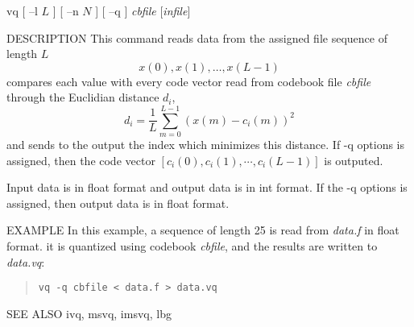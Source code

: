 
\begin{synopsis}
\item [vq] [ --l $L$ ] [ --n $N$ ] [ --q ] {\em cbfile} [{\em infile}]
\end{synopsis}

\begin{qsection}{DESCRIPTION}
This command reads data from the assigned file sequence of length $L$
\begin{displaymath}
  x(0),x(1),\ldots,x(L-1)
\end{displaymath}
compares each value with every code vector read from
codebook file {\em cbfile} through the Euclidian distance $d_i$,
\begin{displaymath}
d_i = \frac{1}{L}\sum_{m=0}^{L-1} (x(m)-c_i(m))^2
\end{displaymath}
and sends to the output the index which minimizes this distance.
If -q options is assigned, then the code vector
$[c_i(0), c_i(1), \cdots, c_i(L-1)]$ is outputed.
\par
Input data is in float format and output data is in int format.
If the -q options is assigned, then output data is in float format.
\end{qsection}

\begin{options}
\end{options}

\begin{qsection}{EXAMPLE}
In this example, a sequence of length 25 is read from {\em data.f}
in float format.
it is quantized using codebook {\em cbfile},
and the results are written to {\em data.vq}:
\begin{quote}
 \verb!vq -q cbfile < data.f > data.vq!
\end{quote} 
\end{qsection}

\begin{qsection}{SEE ALSO}
ivq, msvq, imsvq, lbg
\end{qsection}
